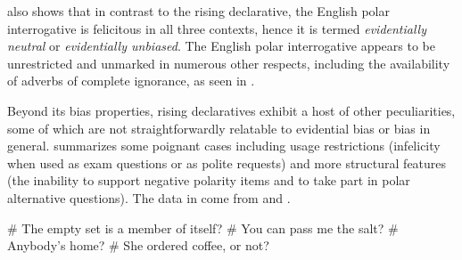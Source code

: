 \documentclass[output=paper,colorlinks,citecolor=brown]{langscibook}
\begin{document}
 also shows that in contrast to the rising declarative, the English polar interrogative is felicitous in all three contexts, hence it is termed \textit{evidentially neutral} or \textit{evidentially unbiased}. The English polar interrogative appears to be unrestricted and unmarked in numerous other respects, including the availability of adverbs of complete ignorance, as seen in .
 
Beyond its bias properties, rising declaratives exhibit a host of other peculiarities, some of which are not straightforwardly relatable to evidential bias or bias in general.  summarizes some poignant cases including usage restrictions (infelicity when used as exam questions or as polite requests) and more structural features (the inability to support negative polarity items and to take part in polar alternative questions). The data in  come from \citet{huddleston94} and \citet{gunlogson}.

\ea\label{ex:11:3}
\ea\label{ex:11:3a}
\# The empty set is a member of itself?  %
\ex\label{ex:11:3b}
\# You can pass me the salt?  %
\ex\label{ex:11:3c}
\# Anybody's home?  %
\ex\label{ex:11:3d}
\# She ordered coffee, or not?  %
\z
\z
\end{document}

